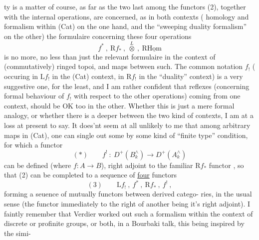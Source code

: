 
 ty is a matter of course,  as far as the two last among the functors
(2),  together with the  internal operations,  are concerned,  as in
both contexts ( homology and  formalism within (Cat) on the
one hand,  and the ``sweeping duality formalism'' on the other) 
 the formulaire concerning these four operations
\[ f^{*} \ , \ \mathrm{R}f_{*} \ , \ \overset{L}{\otimes} \ , \ \mathrm{R}\underline{\mathrm{Hom}} \]
is no more, no less than just the relevant formulaire  in the context
of  (commutatively) ringed topoi,  and maps between such.  The common
notation  $f_{!}$  ( occuring in $\mathrm{L}f_{!}$  in the (Cat) context,  in $\mathrm{R}f_{!}$ in the
``duality'' context)  is a very suggestive one,  for the least,  and I am
rather confident that  reflexes (concerning formal behaviour of $f_{!}$
with respect to the other operations)  coming from one context,  should
be OK too in the other.  Whether this is just a mere formal analogy,
or whether there is a deeper between the two kind of contexts,
I am at a loss at present to say.  It does'nt seem at all unlikely to
me that among arbitrary maps in (Cat),  one can single out some\hand{,} by
some kind of ``finite type'' condition,  for which a functor
\[ (*) \qquad f^{!} \ : \ D^{+}(B^{\wedge}_{k}) \longrightarrow D^{+}(A^{\wedge}_{k}) \]
can be defined (where $f: A \longrightarrow B$),  right adjoint to the familiar $\mathrm{R}f_{*}$
functor ,  so that (2) can be completed to a sequence of \uline{four} functors
\[ (3) \qquad \mathrm{L}f_{!} \ , \ f^{*} \ , \ \mathrm{R}f_{*} \ , \ f^{!} \ , \]
forming a seuence of mutually  functors between derived catego-%
ries,  in the usual sense (the functor immediately to the right of
another being it's right adjoint).  I faintly remember that Verdier
worked out such a formalism within the context of discrete or profinite
groups, or both,  in a Bourbaki talk, this being inspired by the simi-%
